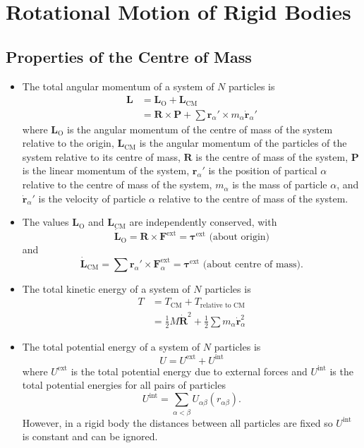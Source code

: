 \documentclass{article}
\renewcommand{\vec}[1]{\boldsymbol{\mathbf{#1}}}
\newcommand{\dvec}[1]{\dot{\vec{#1}}}
\begin{document}
\section{Rotational Motion of Rigid Bodies}

\subsection{Properties of the Centre of Mass}

\begin{itemize}
  \item The total angular momentum of a system of $N$ particles is \begin{align*}
          \vec{L} & = \vec{L}_\text{O} + \vec{L}_\text{CM}                                           \\
                  & = \vec{R} \times \vec{P} + \sum \vec{r}_\alpha' \times m_\alpha \dvec{r}_\alpha'
        \end{align*} where $\vec{L}_\text{O}$ is the angular momentum of the centre of mass of the system relative to the origin, $\vec{L}_\text{CM}$ is the angular momentum of the particles of the system relative to its centre of mass, $\vec{R}$ is the centre of mass of the system, $\vec{P}$ is the linear momentum of the system, $\vec{r}_\alpha'$ is the position of partical $\alpha$ relative to the centre of mass of the system, $m_\alpha$ is the mass of particle $\alpha$, and $\dvec{r}_\alpha'$ is the velocity of particle $\alpha$ relative to the centre of mass of the system.

  \item The values $\vec{L}_\text{O}$ and $\vec{L}_\text{CM}$ are independently conserved, with \[\dvec{L}_\text{O} = \vec{R} \times \vec{F}^\text{ext} = \vec{\tau}^\text{ext} \text{ (about origin)}\] and \[\dvec{L}_\text{CM} = \sum \vec{r}_\alpha' \times \vec{F}_\alpha^\text{ext} = \vec{\tau}^\text{ext} \text{ (about centre of mass)}.\]

  \item The total kinetic energy of a system of $N$ particles is \begin{align*}
          T & = T_\text{CM} + T_\text{relative to CM}                                  \\
            & = \frac{1}{2} M \dvec{R}^2 + \frac{1}{2} \sum m_\alpha \dvec{r}_\alpha^2
        \end{align*}

  \item The total potential energy of a system of $N$ particles is \[U = U^\text{ext} + U^\text{int}\] where $U^\text{ext}$ is the total potential energy due to external forces and $U^\text{int}$ is the total potential energies for all pairs of particles \[U^\text{int} = \sum_{\alpha < \beta} U_{\alpha \beta} (r_{\alpha \beta}).\] However, in a rigid body the distances between all particles are fixed so $U^\text{int}$ is constant and can be ignored.
\end{itemize}
\end{document}
